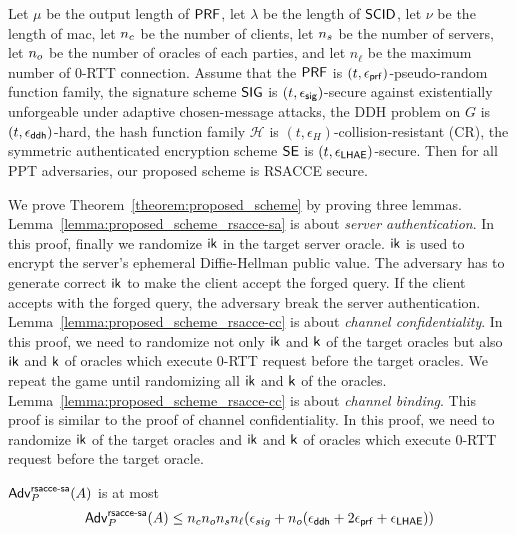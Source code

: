 \begin{theorem} \label{theorem:proposed_scheme}
 Let $\mu$ be the output length of $\mathsf{PRF}$, let $\lambda$ be
 the length of $\mathsf{SCID}$, let $\nu$ be the length of mac, let $n_c$ be the number of
 clients, let $n_s$ be the number of servers, let
 $n_o$ be the number of oracles of each parties, and
 let $n_{\ell}$ be the maximum number of 0-RTT connection. Assume
 that the $\mathsf{PRF}$ is $(t, \epsilon_{\mathsf{prf}})$-pseudo-random
 function family, the signature scheme
 $\mathsf{SIG}$ is $(t, \epsilon_{\mathsf{sig}})$-secure against existentially
 unforgeable under adaptive chosen-message attacks, the DDH
 problem on $G$ is $(t, \epsilon_{\mathsf{ddh}})$-hard, the hash
 function family $\mathcal{H}$ is
 $(t,\epsilon_{H})$-collision-resistant (CR), the symmetric
 authenticated encryption scheme $\mathsf{SE}$ is
 $(t, \epsilon_{\mathsf{LHAE}})$-secure.
 Then for all PPT adversaries, our proposed scheme is RSACCE secure.
\end{theorem}

We prove Theorem~\ref{theorem:proposed_scheme} by proving three lemmas.
Lemma~\ref{lemma:proposed_scheme_rsacce-sa} is about \textit{server authentication}.
In this proof, finally we randomize $\mathsf{ik}$ in the target server oracle.
$\mathsf{ik}$ is used to encrypt the server's ephemeral Diffie-Hellman public
value. The adversary has to generate correct $\mathsf{ik}$ to make the client accept
the forged query. If the client accepts with the forged query, the adversary
break the server authentication.
Lemma~\ref{lemma:proposed_scheme_rsacce-cc} is about \textit{channel confidentiality}.
In this proof, we need to randomize not only $\mathsf{ik}$ and $\mathsf{k}$ of the target oracles
but also $\mathsf{ik}$ and $\mathsf{k}$ of oracles which execute 0-RTT request before the target
oracles. We repeat the game until randomizing all $\mathsf{ik}$ and $\mathsf{k}$ of the oracles.
Lemma~\ref{lemma:proposed_scheme_rsacce-cc} is about \textit{channel binding}.
This proof is similar to the proof of channel confidentiality. In this proof, we need
to randomize $\mathsf{ik}$ of the target oracles and $\mathsf{ik}$ and $\mathsf{k}$ of oracles which execute
0-RTT request before the target oracle.

\begin{lemma} \label{lemma:proposed_scheme_rsacce-sa}
 $\mathsf{Adv}^{\mathsf{rsacce\textsc{-} sa}}_{P}(A)$ is at most
 \begin{eqnarray}
  \mathsf{Adv}^{\mathsf{rsacce\textsc{-} sa}}_{P}(A) \leq n_c n_o n_s n_{\ell}
  (\epsilon_{sig} + n_o (\epsilon_{\mathsf{ddh}} + 2\epsilon_{\mathsf{prf}} + \epsilon_{\mathsf{LHAE}}))
 \end{eqnarray}
\end{lemma}
%



